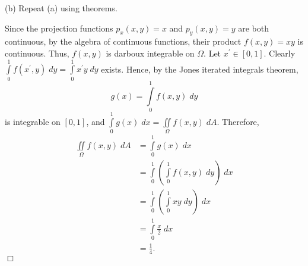\documentclass[11pt]{article}
\begin{document}
\vspace{.2in}

\noindent (b) Repeat (a) using theorems.

\vspace{.2in}

\noindent Since the projection functions $p_x(x,y)=x$ and $p_y(x,y)=y$ are both continuous, by the algebra of continuous functions, their product $f(x,y)=xy$ is continuous. Thus, $f(x,y)$ is darboux integrable on $\Omega$. Let $x^{'}\in [0,1]$. Clearly $\int\limits_0^1f(x^{'},y)\;dy=\int\limits_0^1x^{'}y\;dy$ exists. Hence, by the Jones iterated integrals theorem, 
\[
g(x)=\int\limits_0^1f(x,y)\;dy
\]
\noindent is integrable on $[0,1]$, and $\int\limits_0^1g(x)\;dx=\iint\limits_\Omega f(x,y)\;dA$. Therefore,
\begin{align*}
\iint\limits_\Omega f(x,y)\;dA&=\int\limits_0^1g(x)\;dx\\&=\int\limits_0^1\left(\int\limits_0^1f(x,y)\;dy\right)\;dx\\&=\int\limits_0^1\left(\int\limits_0^1xy\;dy\right)\;dx\\&=\int\limits_0^1\frac{x}{2}\;dx\\&=\frac{1}{4}.
\end{align*}
\hfill $\Box$
\end{document}
